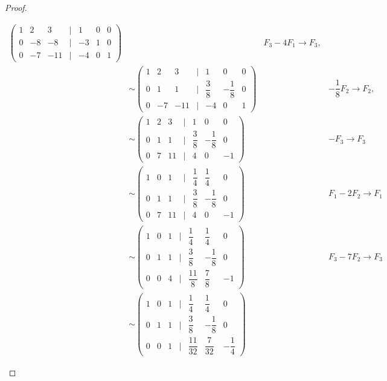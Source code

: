 \documentclass[11pt]{article}
\begin{document}
\begin{proof}
\begin{enumerate}[leftmargin=*,label=\textit{\alph*})]
\begin{align*}
\begin{pmatrix}
            1 & 2 & 3 & | & 1 & 0 & 0\\[0.75em]
            0 & -8 & -8 & | & -3 & 1 & 0\\[0.75em]
            0 & -7 & -11 & | & -4 & 0 & 1
        \end{pmatrix} && F_3 - 4F_1 \rightarrow F_3, \\[0.25em]
            & \sim \begin{pmatrix}
            1 & 2 & 3 & | & 1 & 0 & 0\\[0.75em]
            0 & 1 & 1 & | & \dfrac{3}{8} & -\dfrac{1}{8} & 0\\[0.75em]
            0 & -7 & -11 & | & -4 & 0 & 1
        \end{pmatrix} && -\dfrac{1}{8}F_2 \rightarrow F_2, \\[0.25em]
            & \sim \begin{pmatrix}
            1 & 2 & 3 & | & 1 & 0 & 0\\[0.75em]
            0 & 1 & 1 & | & \dfrac{3}{8} & -\dfrac{1}{8} & 0\\[0.75em]
            0 & 7 & 11 & | & 4 & 0 & -1
        \end{pmatrix} && -F_3 \rightarrow F_3 \\[0.75em]
            & \sim \begin{pmatrix}
            1 & 0 & 1 & | & \dfrac{1}{4} & \dfrac{1}{4} & 0\\[0.75em]
            0 & 1 & 1 & | & \dfrac{3}{8} & -\dfrac{1}{8} & 0\\[0.75em]
            0 & 7 & 11 & | & 4 & 0 & -1
        \end{pmatrix} && F_1 - 2 F_2 \rightarrow F_1 \\[0.75em]
            & \sim \begin{pmatrix}
            1 & 0 & 1 & | & \dfrac{1}{4} & \dfrac{1}{4} & 0\\[0.75em]
            0 & 1 & 1 & | & \dfrac{3}{8} & -\dfrac{1}{8} & 0\\[0.75em]
            0 & 0 & 4 & | & \dfrac{11}{8} & \dfrac{7}{8} & -1
        \end{pmatrix} && F_3 - 7 F_2 \rightarrow F_3 \\[0.75em]
            & \sim \begin{pmatrix}
            1 & 0 & 1 & | & \dfrac{1}{4} & \dfrac{1}{4} & 0\\[0.75em]
            0 & 1 & 1 & | & \dfrac{3}{8} & -\dfrac{1}{8} & 0\\[0.75em]
            0 & 0 & 1 & | & \dfrac{11}{32} & \dfrac{7}{32} & -\dfrac{1}{4}

\end{pmatrix}
\end{align*}
\end{enumerate}
\end{proof}
\end{document}
